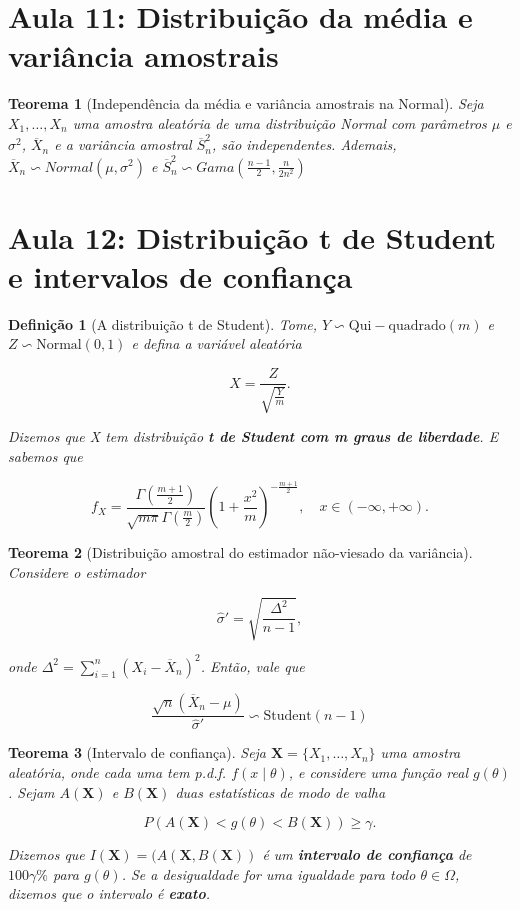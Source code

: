 \documentclass{article}
\newtheorem{theorem}{Teorema}
\newtheorem{definition}{Definição}
\begin{document}
\section*{Aula 11: Distribuição da média e variância amostrais}
\label{s11}
\begin{theorem}[Independência da média e variância amostrais na Normal]
Seja $X_1, \ldots, X_n$ uma amostra aleatória de uma distribuição Normal com parâmetros $\mu$ e $\sigma^2$, $\overline{X}_n$ e a variância amostral $\overline{S}_n^2$, são independentes. Ademais, $\overline{X}_n \backsim Normal \left ( \mu, \sigma^2 \right )$ e $\overline{S}_n^2 \backsim Gama \left ( \frac{n - 1}{2}, \frac{n}{2 n^2} \right )$
\end{theorem}

\section*{Aula 12: Distribuição t de Student  e intervalos de confiança}
\label{s12}
\begin{definition}[A distribuição t de Student]
Tome, $Y \backsim \mathrm{Qui-quadrado}(m)$ e $Z \backsim \mathrm{Normal}(0, 1)$ e defina a variável aleatória

$$X = \frac{Z}{\sqrt{\frac{Y}{m}}}.$$

Dizemos que X tem distribuição \textbf{t de Student com m graus de liberdade}. E sabemos que

$$f_X = \frac{\Gamma(\frac{m + 1}{2})}{\sqrt{m \pi} \Gamma(\frac{m}{2})} \left ( 1 + \frac{x^2}{m} \right )^{-\frac{m + 1}{2}}, \quad x \in (-\infty, + \infty).$$
\end{definition}

\begin{theorem}[Distribuição amostral do estimador não-viesado da variância]

Considere o estimador

$$\hat{\sigma}' = \sqrt{\frac{\Delta^2}{n - 1}},$$

onde $\Delta^2 = \sum_{i = 1}^n (X_i - \overline{X}_n)^2$. Então, vale que

$$\frac{\sqrt{n} (\overline{X}_n - \mu)}{\hat{\sigma}'} \backsim \mathrm{Student}(n - 1)$$
\end{theorem}

\begin{theorem}[Intervalo de confiança]
Seja $\textbf{X} = \{ X_1, \ldots, X_n \}$ uma amostra aleatória, onde cada uma tem p.d.f. $f(x \mid \theta)$, e considere uma função real $g(\theta)$. Sejam $A(\textbf{X})$ e $B(\textbf{X})$ duas estatísticas de modo de valha

\begin{equation}
    P(A(\textbf{X}) < g(\theta) < B(\textbf{X})) \geq \gamma.
\end{equation}

Dizemos que $I(\textbf{X}) = (A(\textbf{X},B(\textbf{X}))$ é um \textbf{intervalo de confiança} de $100 \gamma \%$ para $g(\theta)$. Se a desigualdade for uma igualdade para todo $\theta \in \Omega$, dizemos que o intervalo é \textbf{exato}.
\end{theorem}
\end{document}
